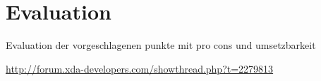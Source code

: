 \chapter{Evaluation}\label{chapter:evaluation}

Evaluation der vorgeschlagenen punkte mit pro cons und umsetzbarkeit\newline

\url{http://forum.xda-developers.com/showthread.php?t=2279813}\newline






